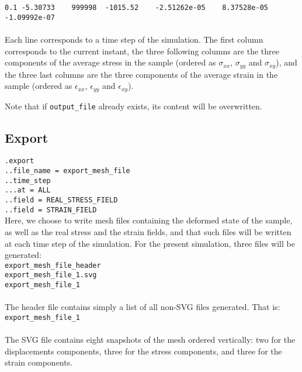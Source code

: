 \documentclass[10pt]{article}
\begin{document}
\noindent \verb+0.1	-5.30733	999998	-1015.52	-2.51262e-05	8.37528e-05	-1.09992e-07+\\

\paragraph{}Each line corresponds to a time step of the simulation. The first column corresponds to the current instant, the three following columns are the three components of  the average stress in the sample (ordered as $\sigma_{xx}$, $\sigma_{yy}$ and $\sigma_{xy}$), and the three last columns are the three components of the average strain in the sample (ordered as $\epsilon_{xx}$, $\epsilon_{yy}$ and $\epsilon_{xy}$).

Note that if \verb+output_file+ already exists, its content will be overwritten.

\subsection{Export}

\verb+.export+\\
\verb+..file_name = export_mesh_file+\\
\verb+..time_step+\\
\verb+...at = ALL+\\
\verb+..field = REAL_STRESS_FIELD+\\
\verb+..field = STRAIN_FIELD+\\

Here, we choose to write mesh files containing the deformed state of the sample, as well as the real stress and the strain fields, and that such files will be written at each time step of the simulation. For the present simulation, three files will be generated:\\

\noindent \verb+export_mesh_file_header+\\
\verb+export_mesh_file_1.svg+\\
\verb+export_mesh_file_1+

\paragraph{}The header file contains simply a list of all non-SVG files generated. That is:\\

\noindent \verb+export_mesh_file_1+

\paragraph{}The SVG file contains eight snapshots of the mesh ordered vertically: two for the displacements components, three for the stress components, and three for the strain components.
\end{document}
